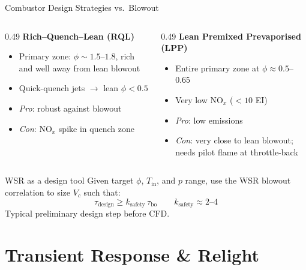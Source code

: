 \documentclass[12pt,aspectratio=169]{beamer}
\newcommand{\taures}{\tau}
\newcommand{\Vr}{V}
\newcommand{\Tin}{T_{\text{in}}}
\begin{document}
\begin{frame}{Combustor Design Strategies vs.\ Blowout}

  \begin{columns}[t]
    \begin{column}{0.49\textwidth}
      \textbf{Rich--Quench--Lean (RQL)}
      \begin{itemize}
        \item Primary zone: $\phi \sim 1.5$--$1.8$, rich and well away from lean blowout
        \item Quick-quench jets $\to$ lean $\phi < 0.5$
        \item \textit{Pro}: robust against blowout
        \item \textit{Con}: NO$_x$ spike in quench zone
      \end{itemize}
    \end{column}
    \begin{column}{0.49\textwidth}
      \textbf{Lean Premixed Prevaporised (LPP)}
      \begin{itemize}
        \item Entire primary zone at $\phi \approx 0.5$--$0.65$
        \item Very low NO$_x$ ($<10$ EI)
        \item \textit{Pro}: low emissions
        \item \textit{Con}: very close to lean blowout; needs pilot flame at throttle-back
      \end{itemize}
    \end{column}
  \end{columns}

  \medskip
  \begin{block}{WSR as a design tool}
    Given target $\phi$, $\Tin$, and $p$ range, use the WSR blowout
    correlation to size $\Vr_c$ such that:
    \[
      \taures_{\text{design}} \geq k_{\text{safety}}\,\taures_{\text{bo}}
      \qquad k_{\text{safety}} \approx 2\text{--}4
    \]
    Typical preliminary design step before CFD.
  \end{block}
\end{frame}

\section{Transient Response \& Relight}
\end{document}
